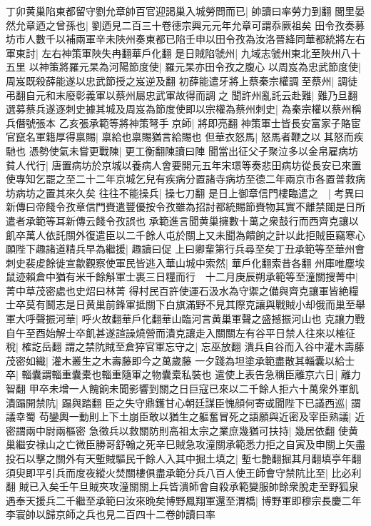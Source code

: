 丁卯黄巢陷東都留守劉允章帥百官迎謁巢入城勞問而已|{
	帥讀曰率勞力到翻}
閭里晏然允章迺之曾孫也|{
	劉迺見二百三十卷德宗興元元年允章可謂忝厥祖矣}
田令孜奏募坊市人數千以補兩軍辛未陜州奏東都已陷壬申以田令孜為汝洛晉絳同華都統將左右軍東討|{
	左右神策軍陜失冉翻華戶化翻}
是日賊陷虢州|{
	九域志虢州東北至陜州八十五里}
以神策將羅元杲為河陽節度使|{
	羅元杲亦田令孜之腹心}
以周岌為忠武節度使|{
	周岌既殺薛能遂以忠武節授之岌逆及翻}
初薛能遣牙將上蔡秦宗權調至蔡州|{
	調徒弔翻自元和末廢彰義軍以蔡州屬忠武軍故得而調之}
聞許州亂託云赴難|{
	難乃旦翻}
選募蔡兵遂逐刺史據其城及周岌為節度使即以宗權為蔡州刺史|{
	為秦宗權以蔡州稱兵僭號張本}
乙亥張承範等將神策弩手京師|{
	將即亮翻}
神策軍士皆長安富家子賂宦官竄名軍籍厚得禀賜|{
	禀給也禀賜猶言給賜也}
但華衣怒馬|{
	怒馬者鞭之以其怒而疾馳也}
憑勢使氣未嘗更戰陳|{
	更工衡翻陳讀曰陣}
聞當出征父子聚泣多以金帛雇病坊貧人代行|{
	唐置病坊於京城以養病人會要開元五年宋璟等奏悲田病坊從長安已來置使專知乞罷之至二十二年京城乞兒有疾病分置諸寺病坊至德二年兩京市各置普救病坊病坊之置其來久矣}
往往不能操兵|{
	操七刀翻}
是日上御章信門樓臨遣之　|{
	考異曰新傳曰帝餞令孜章信門賚遣豐優按令孜雖為招討都統賜節賚物其實不離禁闥是日所遣者承範等耳新傳云餞令孜誤也}
承範進言聞黄巢擁數十萬之衆鼓行而西齊克讓以飢卒萬人依託關外復遣臣以二千餘人屯於關上又未聞為饋餉之計以此拒賊臣竊寒心願陛下趣諸道精兵早為繼援|{
	趣讀曰促}
上曰卿輩第行兵尋至矣丁丑承範等至華州會刺史裴䖍餘徙宣歙觀察使軍民皆逃入華山城中索然|{
	華戶化翻索昔各翻}
州庫唯塵埃鼠迹賴倉中猶有米千餘斛軍士裹三日糧而行　十二月庚辰朔承範等至潼關搜菁中|{
	菁中草茂密處也史炤曰林菁}
得村民百許使運石汲水為守禦之備與齊克讓軍皆絶糧士卒莫有鬭志是日黄巢前鋒軍抵關下白旗滿野不見其際克讓與戰賊小却俄而巢至舉軍大呼聲振河華|{
	呼火故翻華戶化翻華山臨河言黄巢軍聲之盛撼振河山也}
克讓力戰自午至酉始解士卒飢甚遂諠譟燒營而潰克讓走入關關左有谷平日禁人往來以榷征稅|{
	榷訖岳翻}
謂之禁阬賊至倉猝官軍忘守之|{
	忘巫放翻}
潰兵自谷而入谷中灌木壽藤茂密如織|{
	灌木叢生之木壽藤即今之萬歲藤}
一夕踐為坦塗承範盡散其輜囊以給士卒|{
	輜囊謂輜重囊橐也輜重隨軍之物囊槖私裝也}
遣使上表告急稱臣離京六日|{
	離力智翻}
甲卒未增一人餽餉未聞影響到關之日巨寇已來以二千餘人拒六十萬衆外軍飢潰蹋開禁阬|{
	蹋與踏翻}
臣之失守鼎鑊甘心朝廷謀臣愧顔何寄或聞陛下已議西巡|{
	謂議幸蜀}
苟鑾輿一動則上下土崩臣敢以猶生之軀奮冒死之語願與近密及宰臣熟議|{
	近密謂兩中尉兩樞密}
急徵兵以救關防則高祖太宗之業庶幾猶可扶持|{
	幾居依翻}
使黄巢繼安禄山之亡微臣勝哥舒翰之死辛巳賊急攻潼關承範悉力拒之自寅及申關上矢盡投石以擊之關外有天塹賊驅民千餘人入其中掘土填之|{
	塹七艶翻掘其月翻填亭年翻}
須臾即平引兵而度夜縱火焚關樓俱盡承範分兵八百人使王師會守禁阬比至|{
	比必利翻}
賊已入矣壬午旦賊夾攻潼關關上兵皆潰師會自殺承範變服帥餘衆脫走至野狐泉遇奉天援兵二千繼至承範曰汝來晩矣博野鳳翔軍還至渭橋|{
	博野軍即穆宗長慶二年李寰帥以歸京師之兵也見二百四十二卷帥讀曰率}
